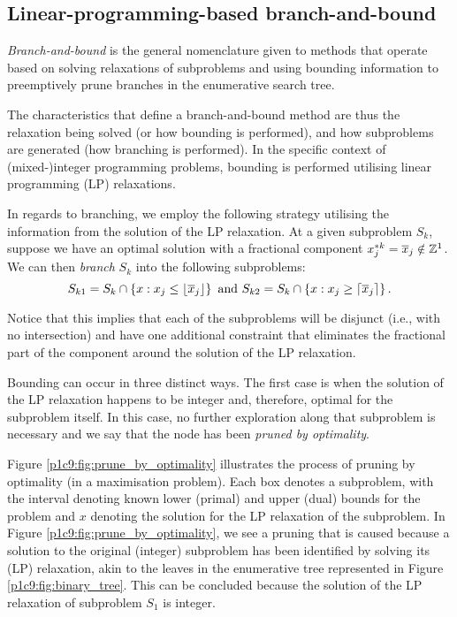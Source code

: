 \subsection{Linear-programming-based branch-and-bound}

\emph{Branch-and-bound} is the general nomenclature given to methods that operate based on solving relaxations of subproblems and using bounding information to preemptively prune branches in the enumerative search tree. 

The characteristics that define a branch-and-bound method are thus the relaxation being solved (or how bounding is performed), and how subproblems are generated (how branching is performed). In the specific context of (mixed-)integer programming problems, bounding is performed utilising linear programming (LP) relaxations. 

In regards to branching, we employ the following strategy utilising the information from the solution of the LP relaxation. At a given subproblem $S_k$, suppose we have an optimal solution with a fractional component $x^{*k}_j = \overline{x}_j \notin \mathbb{Z}^1$. We can then \emph{branch} $S_k$ into the following subproblems:
    \begin{equation*}
        S_{k1} = S_k \cap \left\{ x : x_j \leq \lfloor \overline{x}_j \rfloor \right \} \text{ and }
        S_{k2} = S_k \cap \left\{ x : x_j \geq \lceil \overline{x}_j \rceil \right \}.
    \end{equation*}
	
Notice that this implies that each of the subproblems will be disjunct (i.e., with no intersection) and have one additional constraint that eliminates the fractional part of the component around the solution of the LP relaxation. 

Bounding can occur in three distinct ways. The first case is when the solution of the LP relaxation happens to be integer and, therefore, optimal for the subproblem itself. In this case, no further exploration along that subproblem is necessary and we say that the node has been \emph{pruned by optimality}.

Figure \ref{p1c9:fig:prune_by_optimality} illustrates the process of pruning by optimality (in a maximisation problem). Each box denotes a subproblem, with the interval denoting known lower (primal) and upper (dual) bounds for the problem and $x$ denoting the solution for the LP relaxation of the subproblem. In Figure \ref{p1c9:fig:prune_by_optimality}, we see a pruning that is caused because a solution to the original (integer) subproblem has been identified by solving its (LP) relaxation, akin to the leaves in the enumerative tree represented in Figure \ref{p1c9:fig:binary_tree}. This can be concluded because the solution of the LP relaxation of subproblem $S_1$ is integer. 

